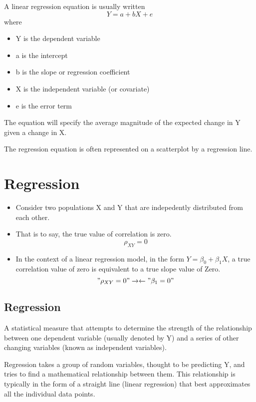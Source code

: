 \documentclass[]{report}
\begin{document}
A linear regression equation is usually written
\[Y = a + bX + e\]
where
\begin{itemize}
	\item Y is the dependent variable
	\item a is the intercept
	\item b is the slope or regression coefficient
	\item X is the independent variable (or covariate)
	\item e is the error term
\end{itemize}
The equation will specify the average magnitude of the expected change in Y given a change in X.

The regression equation is often represented on a scatterplot by a regression line.

					\section{Regression}
					
					\begin{itemize}
						\item Consider two populations X and Y that are indepedently distributed from
						each other.
						\item That is to say, the true value of correlation is zero.
						\[\rho_{XY} = 0 \]
						\item In the context of a linear regression model, in the form $Y=\beta_0  +  \beta_1X$, a true correlation value of zero is equivalent to a true slope value of Zero.
						\["\rho_{XY} = 0" \rightarrow\leftarrow "\beta_1=0"\]
					\end{itemize}
					

					

\subsection{Regression}
A statistical measure that attempts to determine the strength of the relationship between one dependent variable 
(usually denoted by Y) and a series of other changing variables (known as independent variables).

Regression takes a group of random variables, thought to be predicting Y, and tries to find a mathematical relationship between them. This relationship is typically in the form of a straight line (linear regression) that best approximates all the individual data points.
\end{document}
